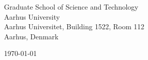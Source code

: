 \begin{minipage}{0.49\textwidth}
\begin{flushleft}
\noindent 
Graduate School of Science and Technology  \\
Aarhus University \\
Aarhus Universitet, Building 1522, Room 112 \\
Aarhus, Denmark
\end{flushleft}
\end{minipage}
\begin{minipage}{0.47\textwidth}
\begin{flushright}
\today
\end{flushright}
\end{minipage} \\

\newcommand{\univ}{Aarhus University}
\newcommand{\univshort}{AU}
\newcommand{\degree}{PhD.}
\newcommand{\dept}{Computer Science}
